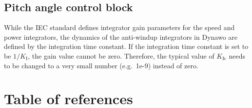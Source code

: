 \documentclass[
  a4paper,
  DIV=11,
  numbers=noendperiod]{scrartcl}
\begin{document}
\subsection{Pitch angle control block}\label{pitch-angle-control-block}

While the IEC standard defines integrator gain parameters for the speed
and power integrators, the dynamics of the anti-windup integrators in
Dynawo are defined by the integration time constant. If the integration
time constant is set to be \(1/K_\mathrm{I}\), the gain value cannot be
zero. Therefore, the typical value of \(K_\mathrm{Ic}\) needs to be
changed to a very small number (e.g.~1e-9) instead of zero.

\section{Table of references}\label{table-of-references}
\end{document}

